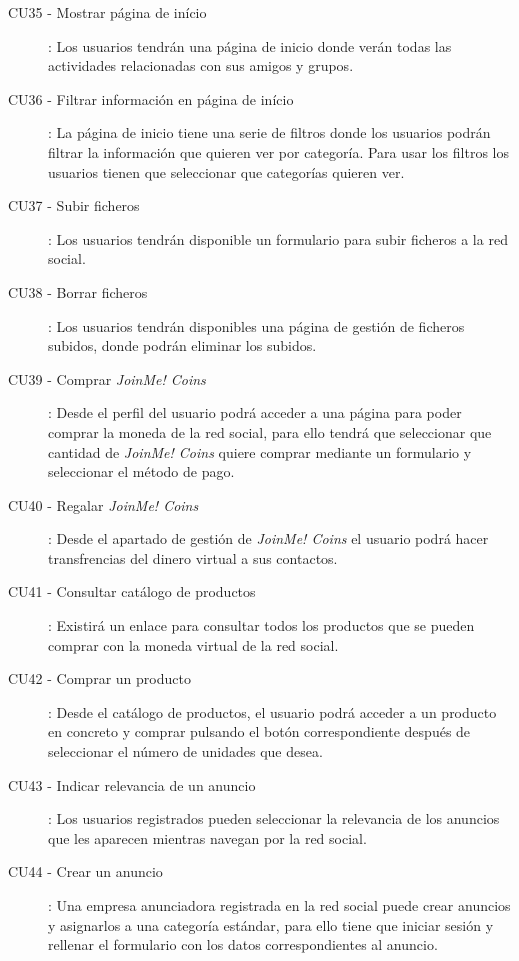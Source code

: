 \documentclass[12pt, a4paper, titlepage]{article}
\begin{document}
\begin{description}
	\item [CU35 - Mostrar página de início]: Los usuarios tendrán una página de inicio donde verán todas las actividades relacionadas con sus amigos y grupos.
	
	\item [CU36 - Filtrar información en página de início]: La página de inicio tiene una serie de filtros donde los usuarios podrán filtrar la información que quieren ver por categoría. Para usar los filtros los usuarios tienen que seleccionar que categorías quieren ver.
	
	\item [CU37 - Subir ficheros]: Los usuarios tendrán disponible un formulario para subir ficheros a la red social.
	
	\item [CU38 - Borrar ficheros]: Los usuarios tendrán disponibles una página de gestión de ficheros subidos, donde podrán eliminar los subidos.
	
	\item [CU39 - Comprar \textit{JoinMe! Coins}]: Desde el perfil del usuario podrá acceder a una página para poder comprar la moneda de la red social, para ello tendrá que seleccionar que cantidad de \textit{JoinMe! Coins} quiere comprar mediante un formulario y seleccionar el método de pago.
	
	\item [CU40 - Regalar \textit{JoinMe! Coins}]: Desde el apartado de gestión de \textit{JoinMe! Coins} el usuario podrá hacer transfrencias del dinero virtual a sus contactos.
	
	\item [CU41 - Consultar catálogo de productos]: Existirá un enlace para consultar todos los productos que se pueden comprar con la moneda virtual de la red social.
		
	\item [CU42 - Comprar un producto]: Desde el catálogo de productos, el usuario podrá acceder a un producto en concreto y comprar pulsando el botón correspondiente después de seleccionar el número de unidades que desea.
	
	\item [CU43 - Indicar relevancia de un anuncio]: Los usuarios registrados pueden seleccionar la relevancia de los anuncios que les aparecen mientras navegan por la red social.
	
	\item [CU44 - Crear un anuncio]: Una empresa anunciadora registrada en la red social puede crear anuncios y asignarlos a una categoría estándar, para ello tiene que iniciar sesión y rellenar el formulario con los datos correspondientes al anuncio.
	

\end{description}
\end{document}

